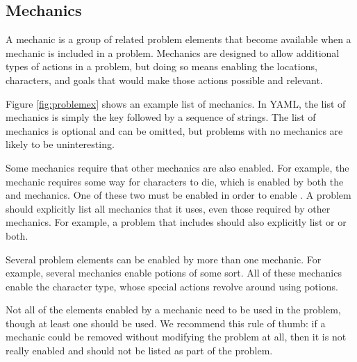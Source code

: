 \documentclass{nilreport}
\begin{document}
\newpage

\subsection{Mechanics} \label{sec:mechanics}

A mechanic is a group of related problem elements that become available when a mechanic is included in a problem. Mechanics are designed to allow additional types of actions in a problem, but doing so means enabling the locations, characters, and goals that would make those actions possible and relevant.

Figure \ref{fig:problemex} shows an example list of mechanics. In YAML, the list of mechanics is simply the key  followed by a sequence of strings. The list of mechanics is optional and can be omitted, but problems with no mechanics are likely to be uninteresting.

Some mechanics require that other mechanics are also enabled. For example, the  mechanic requires some way for characters to die, which is enabled by both the  and  mechanics. One of these two must be enabled in order to enable . A problem should explicitly list all mechanics that it uses, even those required by other mechanics. For example, a problem that includes  should also explicitly list  or  or both.

Several problem elements can be enabled by more than one mechanic. For example, several mechanics enable potions of some sort. All of these mechanics enable the  character type, whose special actions revolve around using potions.

Not all of the elements enabled by a mechanic need to be used in the problem, though at least one should be used. We recommend this rule of thumb: if a mechanic could be removed without modifying the problem at all, then it is not really enabled and should not be listed as part of the problem.

\end{document}
